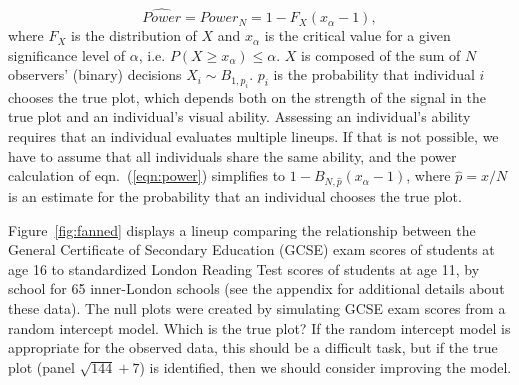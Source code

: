 \documentclass{article} %
\begin{document}
{\begin{equation}\label{eqn:power}
\widehat{Power} = {Power}_{N} = 1 - F_{X} (x_{\alpha} - 1),
\end{equation}
where $F_X$ is the distribution of $X$ and $x_\alpha$ is the critical value for a given significance level of $\alpha$, i.e. $P(X \ge x_{\alpha}) \le \alpha$. $X$ is composed of the sum of $N$ observers' (binary) decisions $X_i \sim B_{1, p_i}$.  $p_i$ is the probability that individual $i$ chooses the true plot, which  depends both on the strength of the signal in the true plot and an individual's visual ability.
Assessing an individual's ability requires that an individual evaluates multiple lineups. If that is not possible, we have to assume that all individuals share the same ability, and the power calculation of eqn.~(\ref{eqn:power}) simplifies to $1 - B_{N, \hat{p}}(x_\alpha-1)$, where $\widehat{p} = x/N$ is an estimate for the probability that an individual chooses the true plot.

}

Figure~\ref{fig:fanned} displays a lineup comparing the relationship between the  General Certificate of Secondary Education (GCSE) exam scores of students at age 16 to  standardized London Reading Test scores of students at age 11, by school for 65 inner-London schools (see the appendix for additional details about these data). The null plots were created by simulating GCSE exam scores from a random intercept model. Which is the true plot? If the random intercept model is appropriate for the observed data, this should be a difficult task, but if the true plot (panel $\sqrt{144} + 7$) is identified, then we should consider improving the model.
\end{document}
